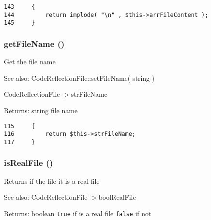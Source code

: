 \begin{Code}\begin{verbatim}143     {
144         return implode( "\n" , $this->arrFileContent );
145     }
\end{verbatim}
\end{Code}


\hypertarget{class_code_reflection_file_fdeebfe3fcf5806fc79c074a6a3a6eb1}{
\subsubsection[{getFileName}]{\setlength{\rightskip}{0pt plus 5cm}getFileName ()}}
\label{class_code_reflection_file_fdeebfe3fcf5806fc79c074a6a3a6eb1}


Get the file name

\begin{Desc}
\item[See also:]CodeReflectionFile::setFileName( string ) 

CodeReflectionFile-$>$strFileName \end{Desc}
\begin{Desc}
\item[Returns:]string file name \end{Desc}


\begin{Code}\begin{verbatim}115     {
116         return $this->strFileName;
117     }
\end{verbatim}
\end{Code}


\hypertarget{class_code_reflection_file_b4f25d8d159fec063aa515e91ccd5c97}{
\subsubsection[{isRealFile}]{\setlength{\rightskip}{0pt plus 5cm}isRealFile ()}}
\label{class_code_reflection_file_b4f25d8d159fec063aa515e91ccd5c97}


Returns if the file it is a real file

\begin{Desc}
\item[See also:]CodeReflectionFile-$>$boolRealFile \end{Desc}
\begin{Desc}
\item[Returns:]boolean {\tt true} if is a real file {\tt false} if not \end{Desc}


